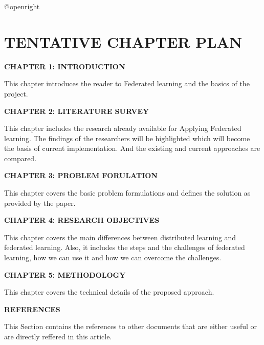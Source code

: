 \documentclass[14pt]{extarticle}
\makeatletter
\newcommand\backmatter{
    \if @openright
        \cleardoublepage
    \else
        \clearpage
    \fi
}
\makeatother
\begin{document}
\backmatter

\newpage
{}
\section*{TENTATIVE CHAPTER PLAN}

\textbf{CHAPTER 1: INTRODUCTION }

\par This chapter introduces the reader to Federated learning and the basics of the project.

\textbf{CHAPTER 2: LITERATURE SURVEY}

\par This chapter includes the research already available for Applying Federated learning. The findings of the researchers will be highlighted which will become the basis of current implementation. And the existing and current approaches are compared. 

\textbf{CHAPTER 3: PROBLEM FORULATION}

\par This chapter covers the basic problem formulations and defines the solution as provided by the paper.

\textbf{CHAPTER 4: RESEARCH OBJECTIVES}

\par This chapter covers the main differences between distributed learning and federated learning. Also, it includes the steps and the challenges of federated learning, how we can use it and how we can overcome the challenges.
 
\textbf{CHAPTER 5: METHODOLOGY}

\par This chapter covers the technical details of the proposed approach. 

\textbf{REFERENCES}

\par This Section contains the references to other documents that are either useful or are directly reffered in this article.


\newpage
{}
\end{document}
